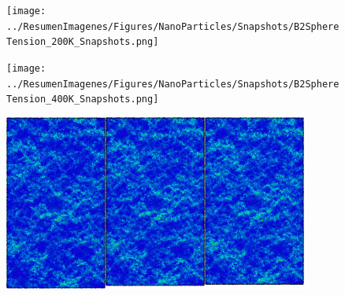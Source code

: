 \begin{figure}[htp]
\centering
\texttt{[image: ../ResumenImagenes/Figures/NanoParticles/Snapshots/B2SphereTension\_200K\_Snapshots.png]}
\caption[Inclusión de CuZr-B2 bajo tracción a 200K]{}
\label{C4:fg:snapshot_ten_B2_200K}
\end{figure}


\clearpage

\begin{figure}[htp]
\centering
\texttt{[image: ../ResumenImagenes/Figures/NanoParticles/Snapshots/B2SphereTension\_400K\_Snapshots.png]}
\caption[Inclusión de CuZr-B2 bajo tracción a 400K]{}
\label{C4:fg:snapshot_ten_B2_400K}
\end{figure}

\begin{figure}[htp]
\centering
\includegraphics[width=10cm]{../ResumenImagenes/Figures/NanoParticles/Snapshots/B2SphereCompression_10K_Snapshots.png}
\caption[Inclusión de CuZr-B2 bajo compresión a 10K]{}
\label{C4:fg:snapshot_comp_B2_10K}
\end{figure}

